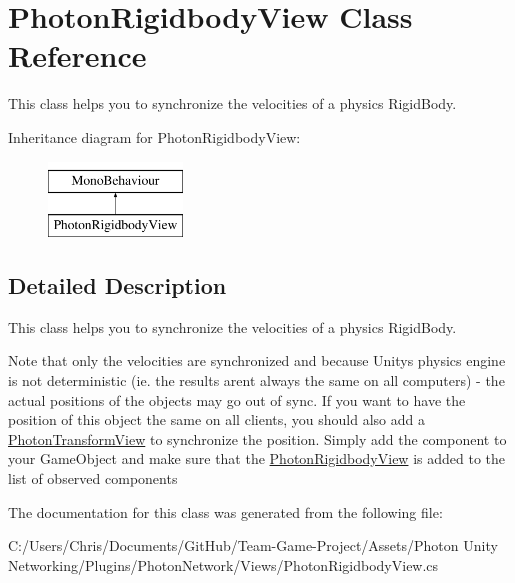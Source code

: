\hypertarget{class_photon_rigidbody_view}{}\section{Photon\+Rigidbody\+View Class Reference}
\label{class_photon_rigidbody_view}


This class helps you to synchronize the velocities of a physics Rigid\+Body.  


Inheritance diagram for Photon\+Rigidbody\+View\+:\begin{figure}[H]
\begin{center}
\leavevmode
\includegraphics[height=2.000000cm]{class_photon_rigidbody_view}
\end{center}
\end{figure}


\subsection{Detailed Description}
This class helps you to synchronize the velocities of a physics Rigid\+Body. 

Note that only the velocities are synchronized and because Unitys physics engine is not deterministic (ie. the results aren\textquotesingle{}t always the same on all computers) -\/ the actual positions of the objects may go out of sync. If you want to have the position of this object the same on all clients, you should also add a \hyperlink{class_photon_transform_view}{Photon\+Transform\+View} to synchronize the position. Simply add the component to your Game\+Object and make sure that the \hyperlink{class_photon_rigidbody_view}{Photon\+Rigidbody\+View} is added to the list of observed components 

The documentation for this class was generated from the following file\+:\begin{DoxyCompactItemize}
\item 
C\+:/\+Users/\+Chris/\+Documents/\+Git\+Hub/\+Team-\/\+Game-\/\+Project/\+Assets/\+Photon Unity Networking/\+Plugins/\+Photon\+Network/\+Views/Photon\+Rigidbody\+View.\+cs\end{DoxyCompactItemize}

